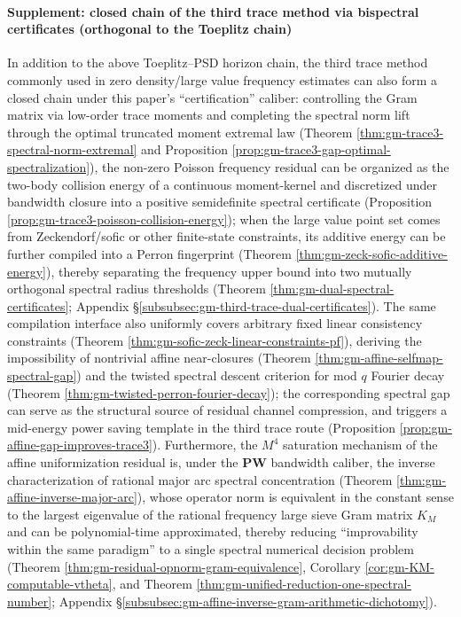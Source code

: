 \paragraph{Supplement: closed chain of the third trace method via bispectral certificates (orthogonal to the Toeplitz chain)}
In addition to the above Toeplitz--PSD horizon chain, the third trace method commonly used in zero density/large value frequency estimates can also form a closed chain under this paper's ``certification'' caliber: controlling the Gram matrix via low-order trace moments and completing the spectral norm lift through the optimal truncated moment extremal law (Theorem \ref{thm:gm-trace3-spectral-norm-extremal} and Proposition \ref{prop:gm-trace3-gap-optimal-spectralization}), the non-zero Poisson frequency residual can be organized as the two-body collision energy of a continuous moment-kernel and discretized under bandwidth closure into a positive semidefinite spectral certificate (Proposition \ref{prop:gm-trace3-poisson-collision-energy}); when the large value point set comes from Zeckendorf/sofic or other finite-state constraints, its additive energy can be further compiled into a Perron fingerprint (Theorem \ref{thm:gm-zeck-sofic-additive-energy}), thereby separating the frequency upper bound into two mutually orthogonal spectral radius thresholds (Theorem \ref{thm:gm-dual-spectral-certificates}; Appendix \S\ref{subsubsec:gm-third-trace-dual-certificates}).
The same compilation interface also uniformly covers arbitrary fixed linear consistency constraints (Theorem \ref{thm:gm-sofic-zeck-linear-constraints-pf}), deriving the impossibility of nontrivial affine near-closures (Theorem \ref{thm:gm-affine-selfmap-spectral-gap}) and the twisted spectral descent criterion for mod \(q\) Fourier decay (Theorem \ref{thm:gm-twisted-perron-fourier-decay}); the corresponding spectral gap can serve as the structural source of residual channel compression, and triggers a mid-energy power saving template in the third trace route (Proposition \ref{prop:gm-affine-gap-improves-trace3}).
Furthermore, the \(M^4\) saturation mechanism of the affine uniformization residual is, under the \(\mathbf{PW}\) bandwidth caliber, the inverse characterization of rational major arc spectral concentration (Theorem \ref{thm:gm-affine-inverse-major-arc}), whose operator norm is equivalent in the constant sense to the largest eigenvalue of the rational frequency large sieve Gram matrix \(K_M\) and can be polynomial-time approximated, thereby reducing ``improvability within the same paradigm'' to a single spectral numerical decision problem (Theorem \ref{thm:gm-residual-opnorm-gram-equivalence}, Corollary \ref{cor:gm-KM-computable-vtheta}, and Theorem \ref{thm:gm-unified-reduction-one-spectral-number}; Appendix \S\ref{subsubsec:gm-affine-inverse-gram-arithmetic-dichotomy}).
